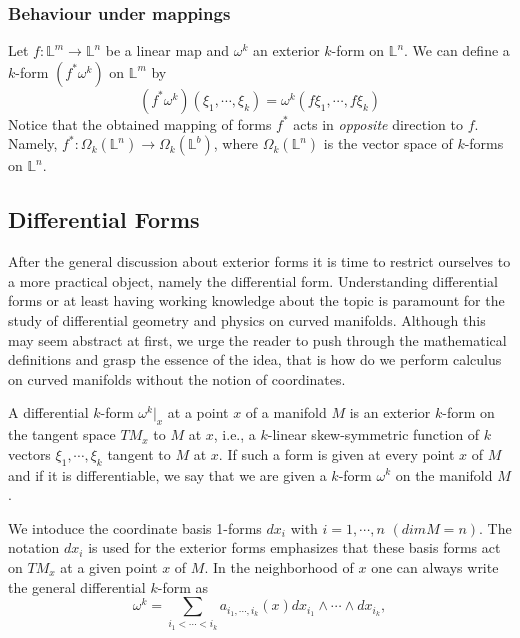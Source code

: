 \subsubsection{Behaviour under mappings}
Let $f:\mathbb{L}^m\rightarrow\mathbb{L}^n$ be a linear map and $\omega^k$ an
exterior $k$-form on $\mathbb{L}^n$. We can define a $k$-form $(f^*\omega^k)$
on $\mathbb{L}^m$ by
\begin{equation}
  (f^*\omega^k)(\xi_1,\cdots,\xi_k) = \omega^k(f\xi_1,\cdots,f\xi_k)
\end{equation}
Notice that the obtained mapping of forms $f^*$ acts in \textit{opposite}
direction to $f$. Namely,
$f^*:\Omega_k(\mathbb{L}^n)\rightarrow\Omega_k(\mathbb{L}^b)$, where
$\Omega_k(\mathbb{L}^n)$ is the vector space of $k$-forms on $\mathbb{L}^n$.
\subsection{Differential Forms}
After the general discussion about exterior forms it is time to restrict
ourselves to a more practical object, namely the differential form.
Understanding differential forms or at least having working knowledge about the
topic is paramount for the study of differential geometry and physics on curved
manifolds. Although this may seem abstract at first, we urge the reader to push
through the mathematical definitions and grasp the essence of the idea, that is
how do we perform calculus on curved manifolds without the notion of
coordinates. 
\begin{definition}
  A differential $k$-form $\omega^k\vert_x$ at a point $x$ of a manifold $M$ is
  an exterior $k$-form on the tangent space $TM_x$ to $M$ at $x$, i.e.,
  a $k$-linear skew-symmetric function of $k$ vectors $\xi_1,\cdots,\xi_k$
  tangent to $M$ at $x$. If such a form is given at every point $x$ of $M$ and
  if it is differentiable, we say that we are given a $k$-form $\omega^k$ on
  the manifold $M$.
\end{definition}
We intoduce the coordinate basis 1-forms $dx_i$ with $i=1,\cdots,n$ $(dimM
= n)$. The notation $dx_i$ is used for the exterior forms emphasizes that these
basis forms act on $TM_x$ at a given point $x$ of $M$. In the neighborhood of
$x$ one can always write the general differential $k$-form as
\begin{equation}
  \omega^k
  = \sum_{i_1<\cdots<i_k}{a_{i_1,\cdots,i_k}(x)dx_{i_1}\wedge\cdots\wedge
  dx_{i_k}},
  \label{eq:generaldifferentialform}
\end{equation}
